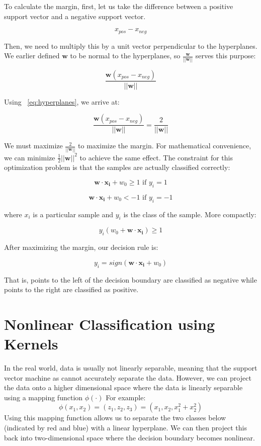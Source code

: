 \documentclass{article}
\begin{document}
To calculate the margin, first, let us take the difference between a positive support vector and a negative support vector.

\[ x_{pos} - x_{neg} \]

Then, we need to multiply this by a unit vector perpendicular to the hyperplanes. We earlier defined $\bm{w}$ to be normal to the hyperplanes, so $\frac{\bm{w}}{||\bm{w}||}$ serves this purpose:

\[ \frac{\bm{w}(x_{pos} - x_{neg})}{||\bm{w}||} \]

Using ~\ref{eq:hyperplanes}, we arrive at:

\[ \frac{\bm{w}(x_{pos} - x_{neg})}{||\bm{w}||} = \frac{2}{||\bm{w}||} \]


We must maximize $\frac{2}{||\bm{w}||}$ to maximize the margin. For mathematical convenience, we can minimize $\frac{1}{2}{||\bm{w}||^2}$ to achieve the same effect. The constraint for this optimization problem is that the samples are actually classified correctly:

\[ \bm{w \cdot x_{i}} + w_0 \geq 1 \text{ if $y_i = 1$} \]

\[ \bm{w \cdot x_{i}} + w_0 < -1 \text{ if $y_i = -1$}\]

where $x_i$ is a particular sample and $y_i$ is the class of the sample. More compactly:

\[ y_i(w_0 + \bm{w \cdot x_i}) \geq 1 \]

After maximizing the margin, our decision rule is:

\[ y_i = sign(\bm{w \cdot x_i} + w_0) \]

That is, points to the left of the decision boundary are classified as negative while points to the right are classified as positive.

\section{Nonlinear Classification using Kernels}

In the real world, data is usually not linearly separable, meaning that the support vector machine as cannot accurately separate the data. However, we can project the data onto a higher dimensional space where the data is linearly separable using a mapping function $\phi{(\cdot)}$ For example:
\[ \phi{(x_1, x_2)} = (z_1, z_2, z_3) = (x_1, x_2, x_1^2 + x_2^2) \]
Using this mapping function allows us to separate the two classes below (indicated by red and blue) with a linear hyperplane. We can then project this back into two-dimensional space where the decision boundary becomes nonlinear.
\end{document}
